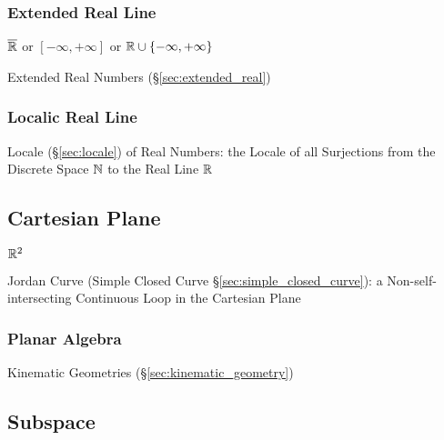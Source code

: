 \subsubsection{Extended Real Line}\label{sec:extended_real_line}

$\overline{\mathbb{R}}$ or $[-\infty, +\infty]$ or $\mathbb{R} \cup \{
-\infty, +\infty\}$

Extended Real Numbers (\S\ref{sec:extended_real})




\subsubsection{Localic Real Line}\label{sec:localic_real_line}

Locale (\S\ref{sec:locale}) of Real Numbers: the Locale of all Surjections from
the Discrete Space $\mathbb{N}$ to the Real Line $\mathbb{R}$



\subsection{Cartesian Plane}\label{sec:cartesian_plane}

$\mathbb{R}^2$

Jordan Curve (Simple Closed Curve \S\ref{sec:simple_closed_curve}): a
Non-self-intersecting Continuous Loop in the Cartesian Plane



\subsubsection{Planar Algebra}\label{sec:planar_algebra}

Kinematic Geometries (\S\ref{sec:kinematic_geometry})



\subsection{Subspace}\label{sec:subspace}


